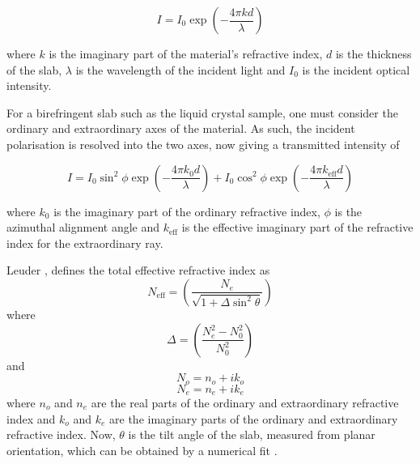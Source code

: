 \begin{equation}
I=I_0\exp\left(-\frac{4\pi kd}{\lambda}\right)
\end{equation}

where $k$ is the imaginary part of the material's refractive index, $d$ is the thickness of the slab, $\lambda$ is the wavelength of the incident light and $I_0$ is the incident optical intensity.

For a birefringent slab such as the liquid crystal sample, one must consider the ordinary and extraordinary axes of the material. As such, the incident polarisation is resolved into the two axes, now giving a transmitted intensity of
 
\begin{equation}
I=I_0 \sin^2 \phi \exp\left(-\frac{4\pi k_0d}{\lambda}\right)+I_0 \cos^2 \phi \exp \left(-\frac{4\pi k_{\text{eff}}d}{\lambda}\right)
\end{equation}

where $k_0$ is the imaginary part of the ordinary refractive index, $\phi$ is the azimuthal alignment angle and $k_{\text{eff}}$ is the effective imaginary part of the refractive index for the extraordinary ray.

Leuder \cite{Lueder2001}, defines the total effective refractive index as
\begin{equation}
N_{\text{eff}}=\left(\frac{N_e}{\sqrt{1+\Delta \sin^2 \theta}}\right)
\end{equation}
where
\begin{equation}
\Delta=\left(\frac{N_e^2-N_0^2}{N_0^2}\right)
\end{equation}
and
\begin{equation}
N_o=n_o+ik_o
\end{equation}
\begin{equation}
N_e=n_e+ik_e
\end{equation}
\noindent where $n_o$ and $n_e$ are the real parts of the ordinary and extraordinary refractive index and $k_o$ and $k_e$ are the imaginary parts of the ordinary and extraordinary refractive index. Now, $\theta$ is the tilt angle of the slab, measured from planar orientation, which can be obtained by a numerical fit \cite{Edwards2010}.


